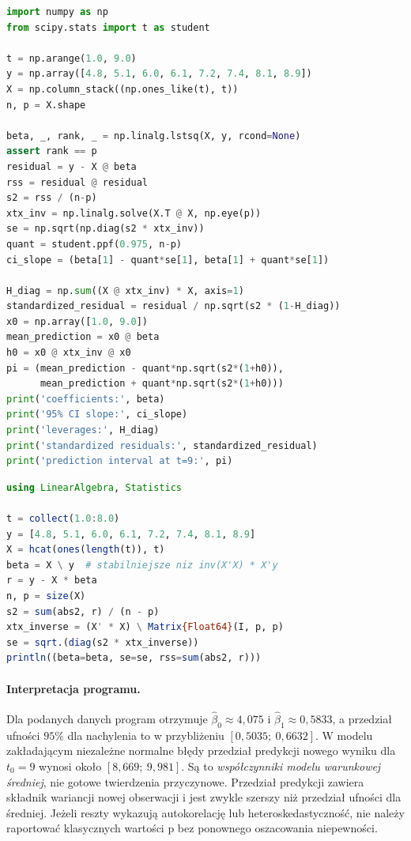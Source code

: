 \documentclass[11pt,a4paper,oneside]{report}
\numberwithin{equation}{chapter}
\theoremstyle{plain}
\theoremstyle{definition}
\theoremstyle{remark}
\begin{document}
\begin{lstlisting}[language=Python,caption={Kompletny program: MNK, przedział dla nachylenia, diagnostyka dźwigni i predykcja (NumPy, SciPy).}]
import numpy as np
from scipy.stats import t as student

t = np.arange(1.0, 9.0)
y = np.array([4.8, 5.1, 6.0, 6.1, 7.2, 7.4, 8.1, 8.9])
X = np.column_stack((np.ones_like(t), t))
n, p = X.shape

beta, _, rank, _ = np.linalg.lstsq(X, y, rcond=None)
assert rank == p
residual = y - X @ beta
rss = residual @ residual
s2 = rss / (n-p)
xtx_inv = np.linalg.solve(X.T @ X, np.eye(p))
se = np.sqrt(np.diag(s2 * xtx_inv))
quant = student.ppf(0.975, n-p)
ci_slope = (beta[1] - quant*se[1], beta[1] + quant*se[1])

H_diag = np.sum((X @ xtx_inv) * X, axis=1)
standardized_residual = residual / np.sqrt(s2 * (1-H_diag))
x0 = np.array([1.0, 9.0])
mean_prediction = x0 @ beta
h0 = x0 @ xtx_inv @ x0
pi = (mean_prediction - quant*np.sqrt(s2*(1+h0)),
      mean_prediction + quant*np.sqrt(s2*(1+h0)))
print('coefficients:', beta)
print('95% CI slope:', ci_slope)
print('leverages:', H_diag)
print('standardized residuals:', standardized_residual)
print('prediction interval at t=9:', pi)
\end{lstlisting}

\begin{lstlisting}[language=Julia,caption={MNK poprzez rozkład QR i błąd standardowy w Julii (standardowe LinearAlgebra, Statistics).}]
using LinearAlgebra, Statistics

t = collect(1.0:8.0)
y = [4.8, 5.1, 6.0, 6.1, 7.2, 7.4, 8.1, 8.9]
X = hcat(ones(length(t)), t)
beta = X \ y  # stabilniejsze niz inv(X'X) * X'y
r = y - X * beta
n, p = size(X)
s2 = sum(abs2, r) / (n - p)
xtx_inverse = (X' * X) \ Matrix{Float64}(I, p, p)
se = sqrt.(diag(s2 * xtx_inverse))
println((beta=beta, se=se, rss=sum(abs2, r)))
\end{lstlisting}

\paragraph{Interpretacja programu.}
Dla podanych danych program otrzymuje \(\widehat\beta_0\approx4{,}075\)
i \(\widehat\beta_1\approx0{,}5833\), a przedział ufności
$95\%$ dla nachylenia to w przybliżeniu
$[0{,}5035;\ 0{,}6632]$. W modelu zakładającym
niezależne normalne błędy przedział predykcji nowego
wyniku dla $t_0=9$ wynosi około $[8{,}669;\ 9{,}981]$.
Są to \emph{współczynniki modelu warunkowej średniej},
nie gotowe twierdzenia przyczynowe. Przedział predykcji zawiera składnik
wariancji nowej obserwacji i jest zwykle szerszy
niż przedział ufności dla średniej. Jeżeli reszty
wykazują autokorelację lub heteroskedastyczność,
nie należy raportować klasycznych wartości p bez
ponownego oszacowania niepewności.
\end{document}
